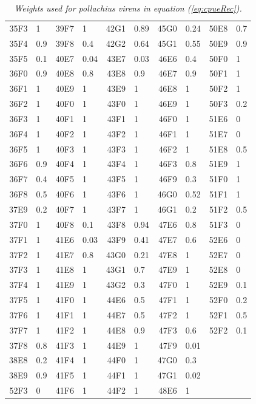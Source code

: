 \documentclass[a4paper 12pt]{article}
\numberwithin{equation}{section}
\begin{document}
\begin{appendices}
\begin{table}[ht]
\begin{footnotesize}
\begin{tabular}{rlrlrlrlrl}
 35F3 &    1 & 39F7 &    1 & 42G1 & 0.89 & 45G0 & 0.24 & 50E8 &  0.7 \\ 
 35F4 &  0.9 & 39F8 &  0.4 & 42G2 & 0.64 & 45G1 & 0.55 & 50E9 &  0.9 \\ 
 35F5 &  0.1 & 40E7 & 0.04 & 43E7 & 0.03 & 46E6 &  0.4 & 50F0 &    1 \\ 
 36F0 &  0.9 & 40E8 &  0.8 & 43E8 &  0.9 & 46E7 &  0.9 & 50F1 &    1 \\ 
 36F1 &    1 & 40E9 &    1 & 43E9 &    1 & 46E8 &    1 & 50F2 &    1 \\ 
 36F2 &    1 & 40F0 &    1 & 43F0 &    1 & 46E9 &    1 & 50F3 &  0.2 \\ 
 36F3 &    1 & 40F1 &    1 & 43F1 &    1 & 46F0 &    1 & 51E6 &    0 \\ 
 36F4 &    1 & 40F2 &    1 & 43F2 &    1 & 46F1 &    1 & 51E7 &    0 \\ 
 36F5 &    1 & 40F3 &    1 & 43F3 &    1 & 46F2 &    1 & 51E8 &  0.5 \\ 
 36F6 &  0.9 & 40F4 &    1 & 43F4 &    1 & 46F3 &  0.8 & 51E9 &    1 \\ 
 36F7 &  0.4 & 40F5 &    1 & 43F5 &    1 & 46F9 &  0.3 & 51F0 &    1 \\ 
 36F8 &  0.5 & 40F6 &    1 & 43F6 &    1 & 46G0 & 0.52 & 51F1 &    1 \\ 
 37E9 &  0.2 & 40F7 &    1 & 43F7 &    1 & 46G1 &  0.2 & 51F2 &  0.5 \\ 
 37F0 &    1 & 40F8 &  0.1 & 43F8 & 0.94 & 47E6 &  0.8 & 51F3 &    0 \\ 
 37F1 &    1 & 41E6 & 0.03 & 43F9 & 0.41 & 47E7 &  0.6 & 52E6 &    0 \\ 
 37F2 &    1 & 41E7 &  0.8 & 43G0 & 0.21 & 47E8 &    1 & 52E7 &    0 \\ 
 37F3 &    1 & 41E8 &    1 & 43G1 &  0.7 & 47E9 &    1 & 52E8 &    0 \\ 
 37F4 &    1 & 41E9 &    1 & 43G2 &  0.3 & 47F0 &    1 & 52E9 &  0.1 \\ 
 37F5 &    1 & 41F0 &    1 & 44E6 &  0.5 & 47F1 &    1 & 52F0 &  0.2 \\ 
 37F6 &    1 & 41F1 &    1 & 44E7 &  0.5 & 47F2 &    1 & 52F1 &  0.5 \\ 
 37F7 &    1 & 41F2 &    1 & 44E8 &  0.9 & 47F3 &  0.6 & 52F2 &  0.1 \\ 
 37F8 &  0.8 & 41F3 &    1 & 44E9 &    1 & 47F9 & 0.01 &  &  \\ 
 38E8 &  0.2 & 41F4 &    1 & 44F0 &    1 & 47G0 &  0.3 &  &  \\ 
 38E9 &  0.9 & 41F5 &    1 & 44F1 &    1 & 47G1 & 0.02 &  &  \\ 
 52F3 &    0 & 41F6 &    1 & 44F2 &    1 & 48E6 &    1 &  &  \\ 
   \hline
\end{tabular}
\caption{\textit{Weights used for pollachius virens in equation (\ref{eq:cpueRec}).}}
\label{tab:weights}
\end{footnotesize}
\end{table}
 
 
\end{appendices}
\end{document}
